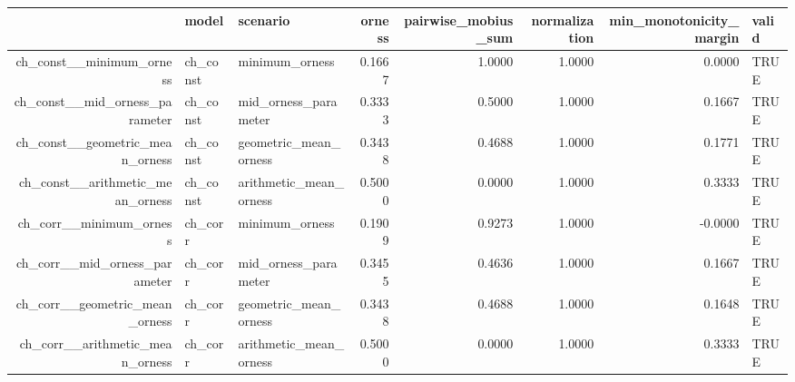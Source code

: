 \begin{table}[ht]
\centering
\begin{tabular}{rllrrrrl}
  \hline
 & model & scenario & orness & pairwise\_mobius\_sum & normalization & min\_monotonicity\_margin & valid \\
  \hline
ch\_const\_\_minimum\_orness & ch\_const & minimum\_orness & 0.1667 & 1.0000 & 1.0000 & 0.0000 & TRUE \\
  ch\_const\_\_mid\_orness\_parameter & ch\_const & mid\_orness\_parameter & 0.3333 & 0.5000 & 1.0000 & 0.1667 & TRUE \\
  ch\_const\_\_geometric\_mean\_orness & ch\_const & geometric\_mean\_orness & 0.3438 & 0.4688 & 1.0000 & 0.1771 & TRUE \\
  ch\_const\_\_arithmetic\_mean\_orness & ch\_const & arithmetic\_mean\_orness & 0.5000 & 0.0000 & 1.0000 & 0.3333 & TRUE \\
  ch\_corr\_\_minimum\_orness & ch\_corr & minimum\_orness & 0.1909 & 0.9273 & 1.0000 & -0.0000 & TRUE \\
  ch\_corr\_\_mid\_orness\_parameter & ch\_corr & mid\_orness\_parameter & 0.3455 & 0.4636 & 1.0000 & 0.1667 & TRUE \\
  ch\_corr\_\_geometric\_mean\_orness & ch\_corr & geometric\_mean\_orness & 0.3438 & 0.4688 & 1.0000 & 0.1648 & TRUE \\
  ch\_corr\_\_arithmetic\_mean\_orness & ch\_corr & arithmetic\_mean\_orness & 0.5000 & 0.0000 & 1.0000 & 0.3333 & TRUE \\
   \hline
\end{tabular}
\end{table}
